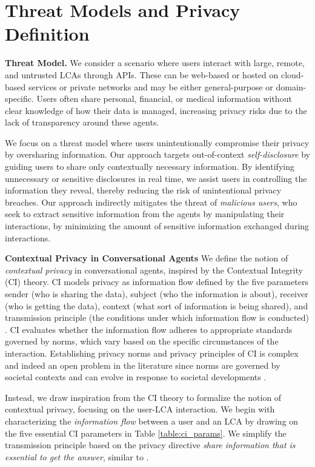 \section{Threat Models and Privacy Definition}
\label{sec::threat_privacy}



\noindent\textbf{Threat Model.} 
We consider a scenario where users interact with large, remote, and untrusted LCAs through APIs. These can be web-based or hosted on cloud-based services or private networks and may be either general-purpose or domain-specific. Users often share personal, financial, or medical information without clear knowledge of how their data is managed, increasing privacy risks due to the lack of transparency around these agents. 


We focus on a threat model where users unintentionally compromise their privacy by oversharing information. Our approach targets out-of-context \emph{self-disclosure} by guiding users to share only contextually necessary information. By identifying unnecessary or sensitive disclosures in real time, we assist users in controlling the information they reveal, thereby reducing the risk of unintentional privacy breaches.
Our approach indirectly mitigates the threat of \emph{malicious users}, who seek to extract sensitive information from the agents by manipulating their interactions, by minimizing the amount of sensitive information exchanged during interactions.






\noindent\textbf{Contextual Privacy in Conversational Agents} 
We define the notion of \textit{contextual privacy} in conversational agents, inspired by the Contextual Integrity (CI) theory. 
CI models privacy as information flow defined by the five parameters sender (who is sharing the data), subject (who the information is about), receiver (who is getting the data), context (what sort of information is being shared), and transmission principle (the conditions under which information flow is conducted) \cite{nissenbaum2004privacy}. CI evaluates whether the information flow adheres to appropriate standards governed by norms, which vary based on the specific circumstances of the interaction. Establishing privacy norms and privacy principles of CI is complex and indeed an open problem in the literature since norms are governed by societal contexts and can evolve in response to societal developments \cite{malkin2023contextual}. 

Instead, we draw inspiration from the CI theory to formalize the notion of contextual privacy, focusing on the user-LCA interaction.
We begin with characterizing the \textit{information flow} between a user and an LCA by drawing on the five essential CI parameters in Table \ref{table:ci_params}. We simplify the transmission principle based on the privacy directive \textit{share information that is essential to get the answer}, similar to \cite{bagdasaryan2024air}.

